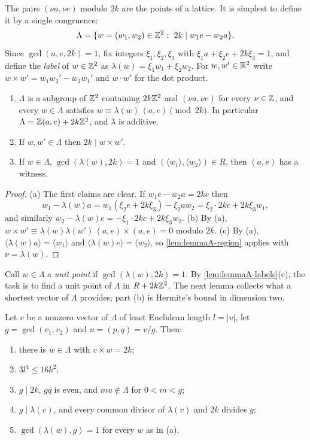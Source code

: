 The pairs $(\nu a,\nu e)$ modulo $2k$ are the points of a lattice. It is
simplest to define it by a single congruence:
\[
\Lambda=\{w=(w_1,w_2)\in\Z^2:\ 2k\mid w_1e-w_2a\}.
\]
Since $\gcd(a,e,2k)=1$, fix integers $\xi_1,\xi_2,\xi_3$ with
$\xi_1 a+\xi_2 e+2k\xi_3=1$, and define the \emph{label} of $w\in\mathbb{Z}^2$ as
$\lambda(w)=\xi_1 w_1+\xi_2 w_2$. For $w,w'\in\mathbb{R}^2$ write
$w\times w'=w_1w_2'-w_2w_1'$ and $w\cdot w'$ for the dot product.

\begin{lemma}[labels]
\label{lem:lemmaA-labels}
\begin{enumerate}
\item[(a)] $\Lambda$ is a subgroup of $\mathbb{Z}^2$ containing $2k\mathbb{Z}^2$ and
$(\nu a,\nu e)$ for every $\nu\in\mathbb{Z}$, and every $w\in\Lambda$ satisfies
$w\equiv\lambda(w)\,(a,e)\pmod{2k}$. In particular
$\Lambda=\mathbb{Z}(a,e)+2k\mathbb{Z}^2$, and $\lambda$ is additive.
\item[(b)] If $w,w'\in\Lambda$ then $2k\mid w\times w'$.
\item[(c)] If $w\in\Lambda$, $\gcd(\lambda(w),2k)=1$ and
$(\langle w_1\rangle,\langle w_2\rangle)\in R$, then $(a,e)$ has a witness.
\end{enumerate}
\end{lemma}

\begin{proof}
(a) The first claims are clear. If $w_1e-w_2a=2kc$ then
\[
w_1-\lambda(w)a=w_1(\xi_2 e+2k\xi_3)-\xi_2 aw_2=\xi_2\cdot2kc+2k\xi_3 w_1,
\]
and similarly $w_2-\lambda(w)e=-\xi_1\cdot2kc+2k\xi_3 w_2$.
(b) By (a), $w\times w'\equiv\lambda(w)\lambda(w')\,(a,e)\times(a,e)=0$
modulo $2k$. (c) By (a), $\langle\lambda(w)a\rangle=\langle w_1\rangle$ and
$\langle\lambda(w)e\rangle=\langle w_2\rangle$, so
\autoref{lem:lemmaA-region} applies with $\nu=\lambda(w)$.
\end{proof}

Call $w\in\Lambda$ a \emph{unit point} if $\gcd(\lambda(w),2k)=1$. By
\autoref{lem:lemmaA-labels}(c), the task is to find a unit point of $\Lambda$
in $R+2k\mathbb{Z}^2$. The next lemma collects what a shortest vector of $\Lambda$
provides; part (b) is Hermite's bound in dimension two.

\begin{lemma}
\label{lem:lemmaA-frame}
Let $v$ be a nonzero vector of $\Lambda$ of least Euclidean length
$l=|v|$, let $g=\gcd(v_1,v_2)$ and $u=(p,q)=v/g$. Then:
\begin{enumerate}
\item[(a)] there is $w\in\Lambda$ with $v\times w=2k$;
\item[(b)] $3l^4\le16k^2$;
\item[(c)] $g\mid2k$, $gq$ is even, and $mu\notin\Lambda$ for $0<m<g$;
\item[(d)] $g\mid\lambda(v)$, and every common divisor of $\lambda(v)$ and
$2k$ divides $g$;
\item[(e)] $\gcd(\lambda(w),g)=1$ for every $w$ as in (a).
\end{enumerate}
\end{lemma}

